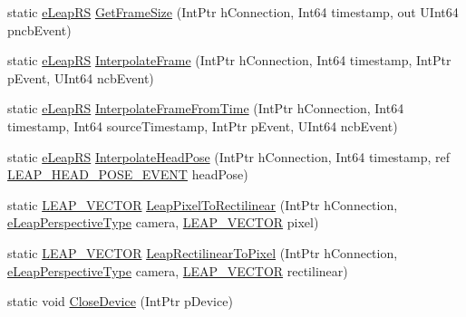 \begin{DoxyCompactItemize}
\item 
static \mbox{\hyperlink{namespace_leap_internal_ae50b07d24c508b84273392b6dcbea1d9}{e\+Leap\+RS}} \mbox{\hyperlink{class_leap_internal_1_1_leap_c_af4b7756a3307a082b6160d6e06d7f187}{Get\+Frame\+Size}} (Int\+Ptr h\+Connection, Int64 timestamp, out U\+Int64 pncb\+Event)
\item 
static \mbox{\hyperlink{namespace_leap_internal_ae50b07d24c508b84273392b6dcbea1d9}{e\+Leap\+RS}} \mbox{\hyperlink{class_leap_internal_1_1_leap_c_a37b93d6d332a4fb88714b1a7583c3ce8}{Interpolate\+Frame}} (Int\+Ptr h\+Connection, Int64 timestamp, Int\+Ptr p\+Event, U\+Int64 ncb\+Event)
\item 
static \mbox{\hyperlink{namespace_leap_internal_ae50b07d24c508b84273392b6dcbea1d9}{e\+Leap\+RS}} \mbox{\hyperlink{class_leap_internal_1_1_leap_c_abfff5fb5bc86a2a4ddf10cdda77af006}{Interpolate\+Frame\+From\+Time}} (Int\+Ptr h\+Connection, Int64 timestamp, Int64 source\+Timestamp, Int\+Ptr p\+Event, U\+Int64 ncb\+Event)
\item 
static \mbox{\hyperlink{namespace_leap_internal_ae50b07d24c508b84273392b6dcbea1d9}{e\+Leap\+RS}} \mbox{\hyperlink{class_leap_internal_1_1_leap_c_a392940c3224b3a95959cd96789902f4c}{Interpolate\+Head\+Pose}} (Int\+Ptr h\+Connection, Int64 timestamp, ref \mbox{\hyperlink{struct_leap_internal_1_1_l_e_a_p___h_e_a_d___p_o_s_e___e_v_e_n_t}{L\+E\+A\+P\+\_\+\+H\+E\+A\+D\+\_\+\+P\+O\+S\+E\+\_\+\+E\+V\+E\+NT}} head\+Pose)
\item 
static \mbox{\hyperlink{struct_leap_internal_1_1_l_e_a_p___v_e_c_t_o_r}{L\+E\+A\+P\+\_\+\+V\+E\+C\+T\+OR}} \mbox{\hyperlink{class_leap_internal_1_1_leap_c_ab1e8d614352632f79ca05e23a617ceb3}{Leap\+Pixel\+To\+Rectilinear}} (Int\+Ptr h\+Connection, \mbox{\hyperlink{namespace_leap_internal_af2a2bc35637b8a453ff772a09a0987a1}{e\+Leap\+Perspective\+Type}} camera, \mbox{\hyperlink{struct_leap_internal_1_1_l_e_a_p___v_e_c_t_o_r}{L\+E\+A\+P\+\_\+\+V\+E\+C\+T\+OR}} pixel)
\item 
static \mbox{\hyperlink{struct_leap_internal_1_1_l_e_a_p___v_e_c_t_o_r}{L\+E\+A\+P\+\_\+\+V\+E\+C\+T\+OR}} \mbox{\hyperlink{class_leap_internal_1_1_leap_c_a5703368f930a99b4f05a475273eb90b9}{Leap\+Rectilinear\+To\+Pixel}} (Int\+Ptr h\+Connection, \mbox{\hyperlink{namespace_leap_internal_af2a2bc35637b8a453ff772a09a0987a1}{e\+Leap\+Perspective\+Type}} camera, \mbox{\hyperlink{struct_leap_internal_1_1_l_e_a_p___v_e_c_t_o_r}{L\+E\+A\+P\+\_\+\+V\+E\+C\+T\+OR}} rectilinear)
\item 
static void \mbox{\hyperlink{class_leap_internal_1_1_leap_c_a15c3ea074e98611c0bebb18d4c9fbea1}{Close\+Device}} (Int\+Ptr p\+Device)

\end{DoxyCompactItemize}
